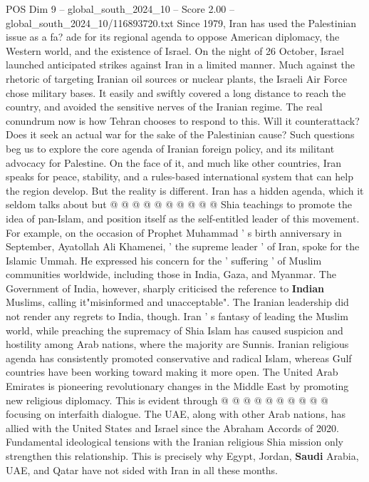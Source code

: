 \begin{textsample}{POS Dim 9 – global\_south\_2024\_10 – Score 2.00 – global\_south\_2024\_10/116893720.txt}  \label{ex:f9_pos_168}
Since 1979, Iran has used the Palestinian issue as a fa? ade for its regional agenda to oppose American diplomacy, the Western world, and the existence of Israel.
On the night of 26 October, Israel launched anticipated strikes against Iran in a limited manner.
Much against the rhetoric of targeting Iranian oil sources or nuclear plants, the Israeli Air Force chose military bases.
It easily and swiftly covered a long distance to reach the country, and avoided the sensitive nerves of the Iranian regime.
The real conundrum now is how Tehran chooses to respond to this.
Will it counterattack?
Does it seek an actual war for the sake of the Palestinian cause?
Such questions beg us to explore the core agenda of Iranian foreign policy, and its militant advocacy for Palestine.
On the face of it, and much like other countries, Iran speaks for peace, stability, and a rules-based international system that can help the region develop.
But the reality is different.
Iran has a hidden agenda, which it seldom talks about but @ @ @ @ @ @ @ @ @ @ Shia teachings to promote the idea of pan-Islam, and position itself as the self-entitled leader of this movement.
For example, on the occasion of Prophet Muhammad ' s birth anniversary in September, Ayatollah Ali Khamenei, ' the supreme leader ' of Iran, spoke for the Islamic Ummah.
He expressed his concern for the ' suffering ' of Muslim communities worldwide, including those in India, Gaza, and Myanmar.
The Government of India, however, sharply criticised the reference to \textbf{Indian} Muslims, calling it"misinformed and unacceptable".
The Iranian leadership did not render any regrets to India, though.
Iran ' s fantasy of leading the Muslim world, while preaching the supremacy of Shia Islam has caused suspicion and hostility among Arab nations, where the majority are Sunnis.
Iranian religious agenda has consistently promoted conservative and radical Islam, whereas Gulf countries have been working toward making it more open.
The United Arab Emirates is pioneering revolutionary changes in the Middle East by promoting new religious diplomacy.
This is evident through @ @ @ @ @ @ @ @ @ @ focusing on interfaith dialogue.
The UAE, along with other Arab nations, has allied with the United States and Israel since the Abraham Accords of 2020.
Fundamental ideological tensions with the Iranian religious Shia mission only strengthen this relationship.
This is precisely why Egypt, Jordan, \textbf{Saudi} Arabia, UAE, and Qatar have not sided with Iran in all these months.

\end{textsample}
